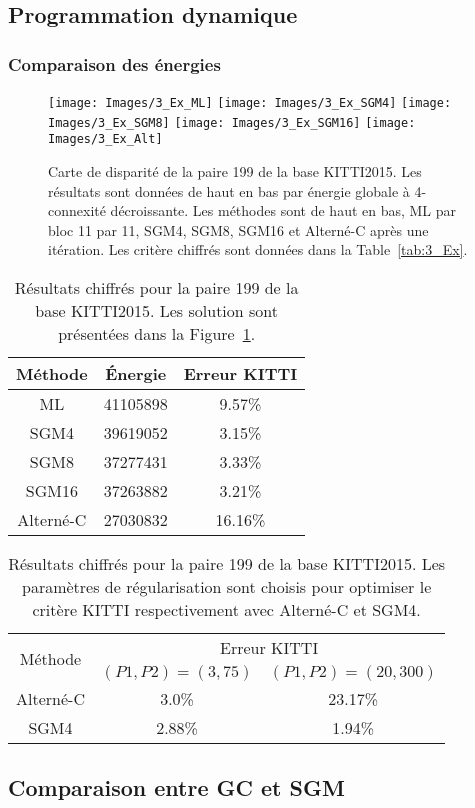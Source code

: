 \documentclass[../main/These_Mathias_Paget.tex]{subfiles}
\begin{document}
\subsection{Programmation dynamique}

\subsubsection{Comparaison des énergies}

\begin{figure}
\centering
\texttt{[image: Images/3\_Ex\_ML]}
\texttt{[image: Images/3\_Ex\_SGM4]}
\texttt{[image: Images/3\_Ex\_SGM8]}
\texttt{[image: Images/3\_Ex\_SGM16]}
\texttt{[image: Images/3\_Ex\_Alt]}
\caption{Carte de disparité de la paire 199 de la base KITTI2015. Les résultats sont données de haut en bas par énergie globale à 4-connexité décroissante. Les méthodes sont de haut en bas, ML par bloc 11 par 11, SGM4, SGM8, SGM16 et Alterné-C après une itération. Les critère chiffrés sont données dans la Table~\ref{tab:3_Ex}.}
\label{fig:3_Ex}
\end{figure}

\begin{table}
\centering
\begin{tabular}{c|cc}
Méthode & Énergie & Erreur KITTI \\
\hline
ML & \num{41105898} & 9.57\% \\
SGM4 & \num{39619052} & 3.15\% \\
SGM8 & \num{37277431} & 3.33\% \\
SGM16 & \num{37263882} & 3.21\% \\
Alterné-C & \num{27030832} & 16.16\% \\
\end{tabular}
\caption{Résultats chiffrés pour la paire 199 de la base KITTI2015. Les solution sont présentées dans la Figure~\ref{fig:3_Ex}.}
\label{tav:3_Ex}
\end{table}


\begin{table}
\centering
\begin{tabular}{c|c|c}
\multirow{2}{*}{Méthode} & \multicolumn{2}{c}{Erreur KITTI} \\
 & $(P1,P2)=(3,75)$ & $(P1,P2)=(20,300)$ \\
\hline
Alterné-C & 3.0\% & 23.17\% \\
SGM4 & 2.88\% & 1.94\% \\
\end{tabular}
\caption{Résultats chiffrés pour la paire 199 de la base KITTI2015. Les paramètres de régularisation sont choisis pour optimiser le critère KITTI respectivement avec Alterné-C et SGM4.}
\label{tav:3_Ex}
\end{table}


\subsection{Comparaison entre GC et SGM}


%



\end{document}
